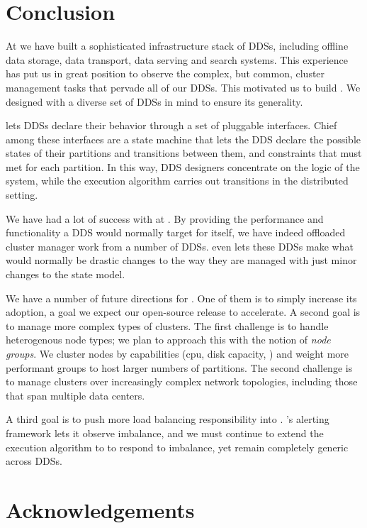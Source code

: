 \section{Conclusion}
\label{sec:conclusion}
%
At \linkedin we have built a sophisticated infrastructure stack of DDSs, including
offline data storage, data transport, data serving and search systems.  This
experience has put us in great position to observe the complex, but common,
cluster management tasks that pervade all of our DDSs.  This motivated us to
build \helix.  We designed \helix with a diverse set of DDSs in mind to ensure
its generality.

\helix lets DDSs declare their behavior through a set of pluggable interfaces.
Chief among these interfaces are a state machine that lets the DDS declare the
possible states of their partitions and transitions between them, and constraints 
that must met for each partition.  In this way, DDS designers concentrate on
the logic of the system, while the \helix execution algorithm carries out transitions in the distributed
setting.  

We have had a lot of success with \helix at \linkedin.  By providing the
performance and functionality a DDS would normally target for itself, we have indeed
offloaded cluster manager work from a number of DDSs.  \helix even lets these DDSs
make what would normally be drastic changes to the way they are managed with
just minor changes to the \helix state model.    

We have a number of future directions for \helix.  One of them is to simply
increase its adoption, a goal we expect our open-source release to accelerate.
A second goal is to manage more complex types of clusters.  The first challenge
is to handle heterogenous node types; we plan to approach this with the notion
of \emph{node groups}.  We cluster nodes by capabilities (cpu, disk capacity,
\etc) and weight more performant groups to host larger numbers of partitions. 
The second challenge is to manage clusters over increasingly complex network
topologies, including those that span multiple data centers.  

A third goal is to push more load balancing responsibility into \helix.  \helix's
alerting framework lets it observe imbalance, and we must continue to extend the
\helix execution algorithm to to respond to imbalance, yet remain completely
generic across DDSs. 

\section{Acknowledgements}
\label{sec:Acknowledgements}


